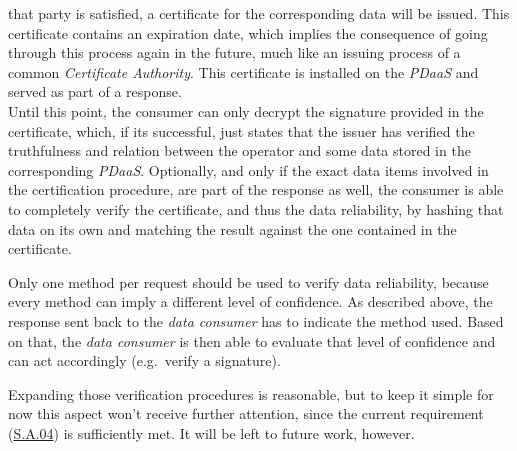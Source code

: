 \documentclass[12pt,english,a4paper,titlepage,cleardoublepage=empty,dottedtoc]{report}
\begin{document}
\begin{enumerate}
  that party is satisfied, a certificate for the corresponding data will
  be issued. This certificate contains an expiration date, which implies
  the consequence of going through this process again in the future,
  much like an issuing process of a common \emph{Certificate Authority}.
  This certificate is installed on the \emph{PDaaS} and served as part
  of a response.\\
  Until this point, the consumer can only decrypt the signature provided
  in the certificate, which, if its successful, just states that the
  issuer has verified the truthfulness and relation between the operator
  and some data stored in the corresponding \emph{PDaaS}. Optionally,
  and only if the exact data items involved in the certification
  procedure, are part of the response as well, the consumer is able to
  completely verify the certificate, and thus the data reliability, by
  hashing that data on its own and matching the result against the one
  contained in the certificate.
\end{enumerate}

Only one method per request should be used to verify data reliability,
because every method can imply a different level of confidence. As
described above, the response sent back to the \emph{data consumer} has
to indicate the method used. Based on that, the \emph{data consumer} is
then able to evaluate that level of confidence and can act accordingly
(e.g.~verify a signature).

Expanding those verification procedures is reasonable, but to keep it
simple for now this aspect won't receive further attention, since the
current requirement (\protect\hyperlink{sa04}{S.A.04}) is sufficiently
met. It will be left to future work, however.
\end{document}
